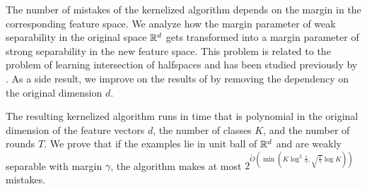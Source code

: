The number of mistakes of the kernelized algorithm depends on the margin in the
corresponding feature space. We analyze how the margin parameter of weak
separability in the original space $\mathbb{R}^d$ gets transformed into a margin
parameter of strong separability in the new feature space. This problem is
related to the problem of learning intersection of halfspaces and has been
studied previously by \citet{Klivans-Servedio-2008}. As a side result, we
improve on the results of \citet{Klivans-Servedio-2008} by removing the
dependency on the original dimension $d$.

The resulting kernelized algorithm runs in time that is polynomial in the
original dimension of the feature vectors $d$, the number of classes $K$, and
the number of rounds $T$. We prove that if the examples lie in unit ball of
$\mathbb{R}^d$ and are weakly separable with margin $\gamma$, the algorithm makes at
most $2^{\widetilde{O}(\min(K \log^2 \frac{1}{\gamma}, \sqrt{\frac{1}{\gamma}}
\log K))}$ mistakes.
